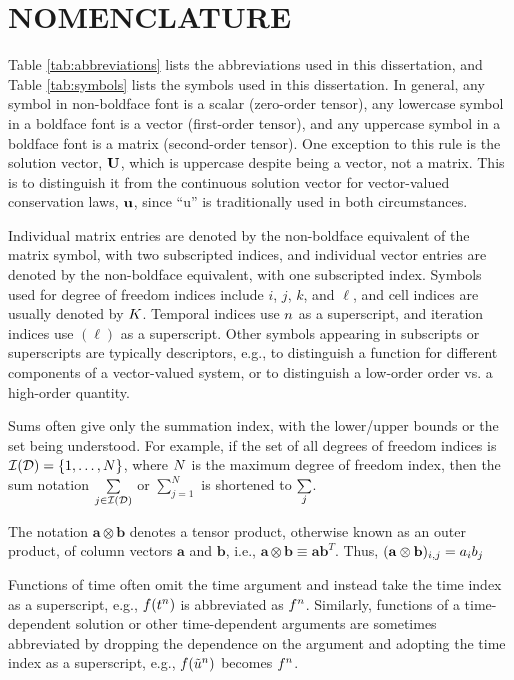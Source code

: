\chapter*{NOMENCLATURE}

Table \ref{tab:abbreviations} lists the abbreviations used in this dissertation,
and Table \ref{tab:symbols} lists the symbols used in this dissertation.
In general, any symbol in non-boldface font is a scalar (zero-order tensor),
any lowercase symbol in a boldface font is a vector (first-order tensor),
and any uppercase symbol in a boldface font is a matrix (second-order tensor).
One exception to this rule is the solution vector, $\mathbf{U}$, which
is uppercase despite being a vector, not a matrix. This is to distinguish
it from the continuous solution vector for vector-valued conservation laws,
$\mathbf{u}$, since ``u'' is traditionally used in both circumstances.

Individual matrix entries are denoted by the non-boldface equivalent of
the matrix symbol, with two subscripted indices, and individual vector entries
are denoted by the non-boldface equivalent, with one subscripted index.
Symbols used for degree of freedom indices include $i$, $j$, $k$, and $\ell$,
and cell indices are usually denoted by $K$. Temporal indices
use $n$ as a superscript, and iteration indices use $(\ell)$
as a superscript. Other symbols appearing in subscripts or superscripts
are typically descriptors, e.g., to distinguish a function for different
components of a vector-valued system, or to distinguish a low-order order
vs. a high-order quantity.

Sums often give only the summation index, with the lower/upper bounds or the
set being understood. For example, if the set of all degrees of freedom indices
is $\mathcal{I}(\mathcal{D})=\{1,\ldots,N\}$, where $N$ is the maximum
degree of freedom index, then the sum notation
$\sum\limits_{j\in\mathcal{I}(\mathcal{D})}$ or $\sum\limits_{j=1}^N$ is shortened
to $\sum\limits_j$.

The notation $\mathbf{a}\otimes\mathbf{b}$ denotes a tensor product, otherwise
known as an outer product, of column vectors $\mathbf{a}$ and $\mathbf{b}$,
i.e., $\mathbf{a}\otimes\mathbf{b}\equiv\mathbf{a}\mathbf{b}^T$. Thus,
$(\mathbf{a}\otimes\mathbf{b})_{i,j} = a_i b_j$

Functions of time often omit the time argument and instead take the time index
as a superscript, e.g., $f(t^n)$ is abbreviated as
$f^n$. Similarly, functions of a time-dependent solution or other
time-dependent arguments are sometimes abbreviated by dropping the dependence
on the argument and adopting the time index as a superscript, e.g.,
$f(\tilde{u}^n)$ becomes $f^n$.

